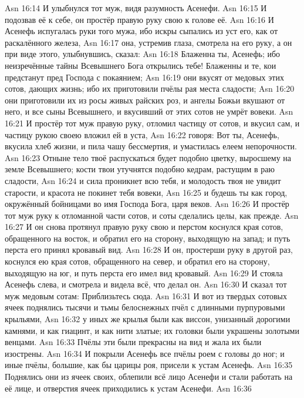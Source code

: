 \vs Asn 16:14
И улыбнулся тот муж, видя разумность Асенефи.
\vs Asn 16:15
И подозвав её к себе, он простёр правую руку свою к голове её.
\vs Asn 16:16
И Асенефь испугалась руки того мужа,
ибо искры сыпались из уст его, как от раскалённого железа,
\vs Asn 16:17
она, устремив глаза,
смотрела на его руку, а он при виде этого, улыбнувшись, сказал:
\vs Asn 16:18
Блаженна ты, Асенефь;
ибо неизречённые тайны Всевышнего Бога открылись тебе!
Блаженны и те, кои предстанут пред Господа с покаянием;
\vs Asn 16:19
они вкусят от медовых этих
сотов, дающих жизнь; ибо их приготовили пчёлы рая места сладости;
\vs Asn 16:20
они приготовили их из росы
живых райских роз, и ангелы Божьи вкушают от него, и все сыны Всевышнего, и
вкусивший от этих сотов не умрёт вовеки.
\vs Asn 16:21
И простёр тот муж правую руку,
отломил частицу от сотов,
и вкусил сам, и частицу рукою своею вложил ей в уста,
\vs Asn 16:22
говоря: Вот ты, Асенефь,
вкусила хлеб жизни, и пила чашу бессмертия,
и умастилась елеем непорочности.
\vs Asn 16:23
Отныне тело твоё
распускаться будет подобно цветку, выросшему на земле Всевышнего; кости твои
утучнятся подобно кедрам, растущим в раю сладости,
\vs Asn 16:24
и сила проникнет всю тебя,
и молодость твоя не увидит старости, и красота не покинет тебя вовеки,
\vs Asn 16:25
и будешь ты как город,
окружённый бойницами во имя Господа Бога, царя веков.
\vs Asn 16:26
И простёр тот муж руку к
отломанной части сотов, и соты сделались целы, как прежде.
\vs Asn 16:27
И он снова протянул правую
руку свою и перстом коснулся края сотов,
обращенного на восток, и обратил его на сторону,
выходящую на запад; и путь перста его принял кровавый вид.
\vs Asn 16:28
И он, простерши руку в другой раз,
коснулся ею края сотов, обращенного на север,
и обратил его на сторону, выходящую на юг,
и путь перста его имел вид кровавый.
\vs Asn 16:29
И стояла Асенефь слева, и
смотрела и видела всё, что делал он.
\vs Asn 16:30
И сказал тот муж медовым сотам: Приблизьтесь сюда.
\vs Asn 16:31
И вот из твердых сотовых
ячеек поднялись тысячи и тьмы белоснежных
пчёл с длинными пурпуровыми крыльями,
\vs Asn 16:32
у иных же крылья были как
виссон, унизанный дорогими камнями,
и как гиацинт, и как нити златые; их головки
были украшены золотыми венцами.
\vs Asn 16:33
Пчёлы эти были прекрасны на
вид и жала их были изострены.
\vs Asn 16:34
И покрыли Асенефь все пчёлы
роем с головы до ног; и иные пчёлы,
большие, как бы царицы роя, присели к устам Асенефь.
\vs Asn 16:35
Поднялись они из ячеек
своих, облепили всё лицо Асенефи
и стали работать на её лице, и отверстия ячеек
приходились к устам Асенефи.
\vs Asn 16:36
